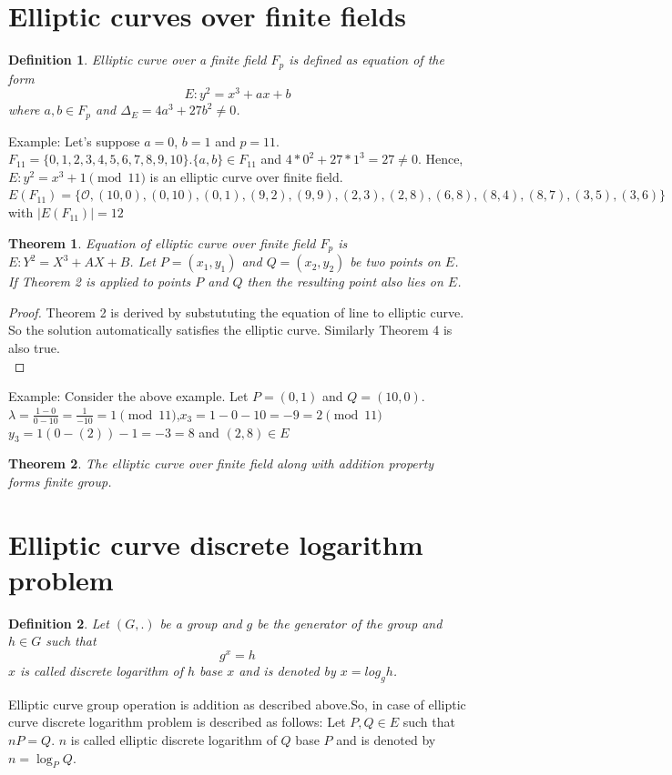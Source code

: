 \documentclass[12pt,a4paper]{report}
\newtheorem{theorem}{Theorem}
\newtheorem{definition}{Definition}
\begin{document}
\section{Elliptic curves over ﬁnite ﬁelds}
\begin{definition}
Elliptic curve over a finite field $F_p$ is defined as equation of the form $$E:y^2 = x^3+ax+b$$ where $a,b\in F_p$ and $\Delta_E = 4a^3+27b^2\neq 0$. 
\end{definition}
Example:
Let's suppose $a=0$, $b=1$ and $p=11$. \\
$F_{11}=\{0,1,2,3,4,5,6,7,8,9,10\}$.$\{a,b\}\in F_{11}$ and $4*0^2+27*1^3=27\neq 0$. Hence, $E:y^2 = x^3+1 \pmod {11} $ is an elliptic curve over finite field. \\
$E(F_{11}) = \{\mathscr{O},(10,0),(0,10),(0,1),(9,2),(9,9),(2,3),(2,8),(6,8),(8,4),(8,7),(3,5),(3,6)\}$
with $|E(F_{11})|=12$
\begin{theorem}
Equation of elliptic curve over finite field $F_p$ is $E : Y^2=X^3+
AX+B$. Let $P=(x_1,y_1)$ and $Q=(x_2,y_2)$ be two points on $E$. If Theorem 2 is applied to points $P$ and $Q$ then the resulting point also lies on $E$.
\end{theorem}
\begin{proof}
Theorem 2 is derived by substututing the equation of line to elliptic curve. So the solution automatically satisfies the elliptic curve. Similarly Theorem 4 is also true.\\
\end{proof}
Example: Consider the above example. Let $P=(0,1)$ and $Q=(10,0)$. 
$\lambda = \frac{1-0}{0-10} = \frac{1}{-	10} = 1 \pmod{11}$,$x_3=1-0-10=-9=2 \pmod{11}$\\ $y_3=1(0-(2))-1=-3=8$ and $(2,8) \in E$ \begin{theorem}
The elliptic curve over finite field along with addition property forms finite group.
\end{theorem}

\cleardoublepage
\section{Elliptic curve discrete logarithm problem}

\begin{definition}
Let $(G,.)$ be a group and $g$ be the generator of the group and $h\in G$ such that $$g^x=h$$
$x$ is called discrete logarithm of $h$ base $x$ and is denoted by $x=log_g h$.
\end{definition}
Elliptic curve group operation is addition as described above.So, in case of elliptic curve discrete logarithm problem is described as follows:
Let $P,Q \in E$ such that $nP=Q$. $n$ is called elliptic discrete logarithm of $Q$ base $P$ and is denoted by $n =\log_P Q$.
\end{document}
